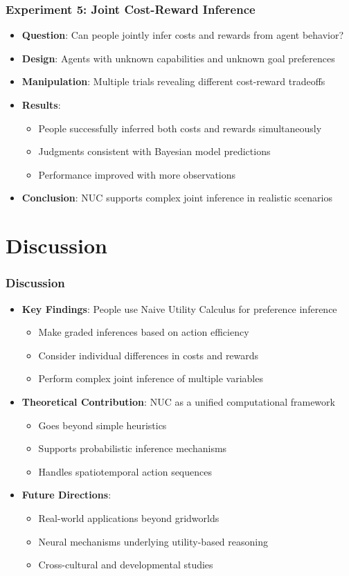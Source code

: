\documentclass{beamer}
\begin{document}
\begin{frame}
\frametitle{Experiment 5: Joint Cost-Reward Inference}
\begin{itemize}
    \item \textbf{Question}: Can people jointly infer costs and rewards from agent behavior?
    \item \textbf{Design}: Agents with unknown capabilities and unknown goal preferences
    \item \textbf{Manipulation}: Multiple trials revealing different cost-reward tradeoffs
    \item \textbf{Results}:
    \begin{itemize}
        \item People successfully inferred both costs and rewards simultaneously
        \item Judgments consistent with Bayesian model predictions
        \item Performance improved with more observations
    \end{itemize}
    \item \textbf{Conclusion}: NUC supports complex joint inference in realistic scenarios
\end{itemize}
\end{frame}

\section{Discussion}
\begin{frame}
\frametitle{Discussion}
\begin{itemize}
    \item \textbf{Key Findings}: People use Naive Utility Calculus for preference inference
    \begin{itemize}
        \item Make graded inferences based on action efficiency
        \item Consider individual differences in costs and rewards
        \item Perform complex joint inference of multiple variables
    \end{itemize}
    \item \textbf{Theoretical Contribution}: NUC as a unified computational framework
    \begin{itemize}
        \item Goes beyond simple heuristics
        \item Supports probabilistic inference mechanisms
        \item Handles spatiotemporal action sequences
    \end{itemize}
    \item \textbf{Future Directions}: 
    \begin{itemize}
        \item Real-world applications beyond gridworlds
        \item Neural mechanisms underlying utility-based reasoning
        \item Cross-cultural and developmental studies
    \end{itemize}
\end{itemize}
\end{frame}
\end{document}
